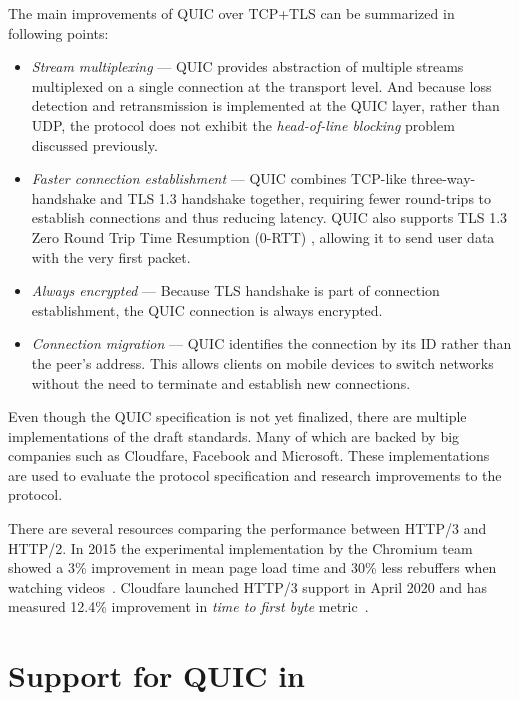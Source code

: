The main improvements of QUIC over TCP+TLS can be summarized in following points:

\begin{itemize}
  \item \textit{Stream multiplexing} ---
    QUIC provides abstraction of multiple streams multiplexed on a single connection at the
    transport level. And because loss detection and retransmission is implemented at the QUIC layer,
    rather than UDP, the protocol does not exhibit the \textit{head-of-line blocking} problem
    discussed previously.

  \item \textit{Faster connection establishment} ---
    QUIC combines TCP-like three-way-handshake and TLS 1.3 handshake together, requiring fewer
    round-trips to establish connections and thus reducing latency. QUIC also supports TLS 1.3 Zero
    Round Trip Time Resumption (0-RTT)
    , allowing it to send user data
    with the very first packet.

  \item \textit{Always encrypted} ---
    Because TLS handshake is part of connection establishment, the QUIC connection is always encrypted.

  \item \textit{Connection migration} ---
    QUIC identifies the connection by its ID rather than the peer's address. This allows clients on
    mobile devices to switch networks without the need to terminate and establish new connections.

\end{itemize}

Even though the QUIC specification is not yet finalized, there are multiple implementations
of the draft standards. Many of which are backed by big companies such as Cloudfare, Facebook and
Microsoft. These implementations are used to evaluate the protocol specification and research
improvements to the protocol.

There are several resources comparing the performance between HTTP/3 and HTTP/2. In 2015 the
experimental implementation by the Chromium team showed a 3\% improvement in mean page load time and
30\% less rebuffers when watching videos~\cite{Wilk2015}. Cloudfare
launched HTTP/3 support in April 2020 and has measured 12.4\% improvement in \textit{time to first
byte} metric~\cite{Tellakula2020}.

\section{Support for QUIC in \dotnet{}}

